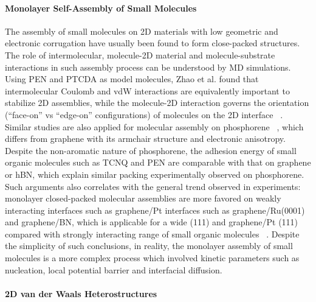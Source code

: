 \paragraph{Monolayer Self-Assembly of Small Molecules}
\label{sec:orgfd77377}

The assembly of small molecules on 2D materials with low geometric and
electronic corrugation have usually been found to form close-packed
structures. The role of intermolecular, molecule-2D material and
molecule-substrate interactions in such assembly process can be
understood by MD simulations. Using PEN and PTCDA as model molecules,
Zhao et al. found that inter\-molecular Coulomb and vdW interactions
are equivalently important to stabilize 2D assemblies, while the
molecule-2D interaction governs the orientation (\ie ``face-on'' vs
``edge-on'' configurations) of molecules on the 2D interface
~\autocite{Zhao_2015_self_assemb_gr_MD}. Similar studies are also applied
for molecular assembly on phosphorene
~\autocite{Mukhopadhyay_2017_cryst_BP}, which differs from graphene with
its armchair structure and electronic anisotropy. Despite the
non-aromatic nature of phosphorene, the adhesion energy of small
organic molecules such as TCNQ and PEN are comparable with that on
graphene or hBN, which explain similar packing experimentally observed
on phosphorene. Such arguments also correlates with the general trend
observed in experiments: monolayer closed-packed molecular assemblies
are more favored on weakly interacting interfaces such as graphene/Pt
interfaces such as graphene/\allowbreak{}Ru(0001) and graphene/BN,
which is applicable for a wide (111) and graphene/Pt (111) compared
with strongly interacting range of small organic molecules
~\autocite{Hamalainen_2012_CoPc_gr_Ir,Xiao_2013_jacs_CuPc_gr,Barja_2010_assembl_donor_gr,Jung_2014_C60_gr_Cu,Yang_2012_MPc_gr_metal,Hamalainen_2012_CoPc_gr_Ir,Tsai_2015_TCNQ_gr_hbn,Stradi_2014_TCNQ_gr_Ru}.
%
Despite the simplicity of such conclusions, in reality, the monolayer
assembly of small molecules is a more complex process which involved
kinetic parameters such as nucleation, local potential barrier and
interfacial diffusion.


\paragraph{2D van der Waals Heterostructures}
\label{sec:org77ea5bc}

